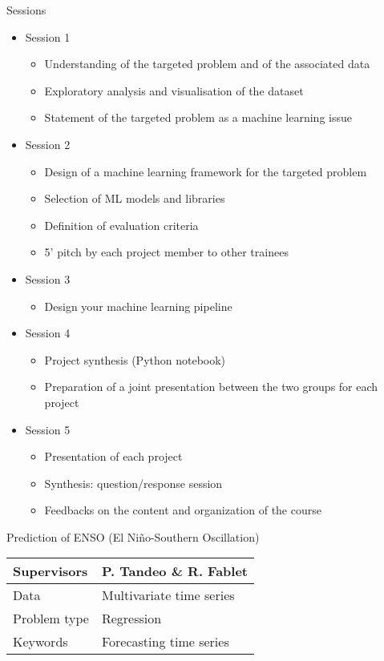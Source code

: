\documentclass[pressentation,10pt,aspectratio=1610, xcolor=table]{beamer}
\begin{document}
\begin{frame}[label={sec:orgb509b88}]{Sessions}
\begin{itemize}
\item Session 1
\begin{itemize}
\item Understanding of the targeted problem and of the associated data
\item Exploratory analysis and visualisation of the dataset
\item Statement of the targeted problem as a machine learning issue
\end{itemize}
\item Session 2
\begin{itemize}
\item Design of a machine learning framework for the targeted problem
\item Selection of ML models and libraries
\item Definition of evaluation criteria
\item 5' pitch by each project member to other trainees
\end{itemize}
\item Session 3
\begin{itemize}
\item Design your machine learning pipeline
\end{itemize}
\item Session 4
\begin{itemize}
\item Project synthesis (Python notebook)
\item Preparation of a joint presentation between the two groups for each project
\end{itemize}
\item Session 5
\begin{itemize}
\item Presentation of each project
\item Synthesis: question/response session
\item Feedbacks on the content and organization of the course
\end{itemize}
\end{itemize}
\end{frame}

\begin{frame}[label={sec:orgd12b96b}]{Prediction of ENSO (El Niño-Southern Oscillation)}
\begin{center}
\begin{tabular}{ll}
\toprule
Supervisors & P. Tandeo \& R. Fablet\\
\midrule
Data & Multivariate time series\\
\midrule
Problem type & Regression\\
\midrule
Keywords & Forecasting time series\\
\bottomrule
\end{tabular}
\end{center}
\end{frame}
\end{document}

